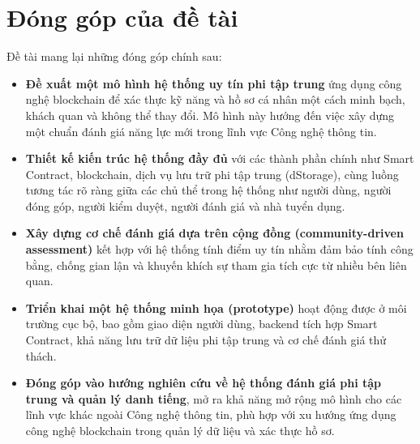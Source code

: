\section{Đóng góp của đề tài}
Đề tài mang lại những đóng góp chính sau:

\begin{itemize}
  \item \textbf{Đề xuất một mô hình hệ thống uy tín phi tập trung} ứng dụng công nghệ blockchain để xác thực kỹ năng và hồ sơ cá nhân một cách minh bạch, khách quan và không thể thay đổi. Mô hình này hướng đến việc xây dựng một chuẩn đánh giá năng lực mới trong lĩnh vực Công nghệ thông tin.

  \item \textbf{Thiết kế kiến trúc hệ thống đầy đủ} với các thành phần chính như Smart Contract, blockchain, dịch vụ lưu trữ phi tập trung (dStorage), cùng luồng tương tác rõ ràng giữa các chủ thể trong hệ thống như người dùng, người đóng góp, người kiểm duyệt, người đánh giá và nhà tuyển dụng.

  \item \textbf{Xây dựng cơ chế đánh giá dựa trên cộng đồng (community-driven assessment)} kết hợp với hệ thống tính điểm uy tín nhằm đảm bảo tính công bằng, chống gian lận và khuyến khích sự tham gia tích cực từ nhiều bên liên quan.

  \item \textbf{Triển khai một hệ thống minh họa (prototype)} hoạt động được ở môi trường cục bộ, bao gồm giao diện người dùng, backend tích hợp Smart Contract, khả năng lưu trữ dữ liệu phi tập trung và cơ chế đánh giá thử thách.

  \item \textbf{Đóng góp vào hướng nghiên cứu về hệ thống đánh giá phi tập trung và quản lý danh tiếng}, mở ra khả năng mở rộng mô hình cho các lĩnh vực khác ngoài Công nghệ thông tin, phù hợp với xu hướng ứng dụng công nghệ blockchain trong quản lý dữ liệu và xác thực hồ sơ.
\end{itemize}